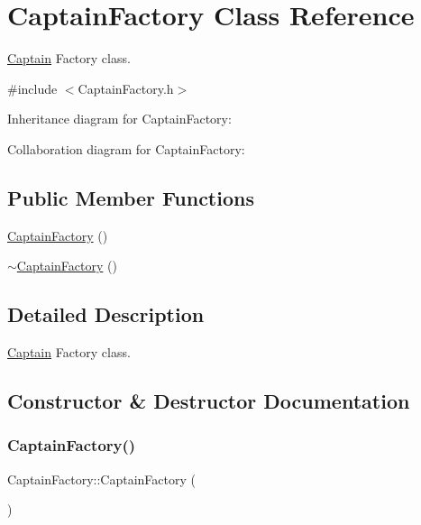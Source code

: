 \hypertarget{classCaptainFactory}{}\section{Captain\+Factory Class Reference}
\label{classCaptainFactory}


\hyperlink{classCaptain}{Captain} Factory class.  




{\ttfamily \#include $<$Captain\+Factory.\+h$>$}



Inheritance diagram for Captain\+Factory\+:


Collaboration diagram for Captain\+Factory\+:
\subsection*{Public Member Functions}
\begin{DoxyCompactItemize}
\item 
\hyperlink{classCaptainFactory_a194bc3adbc4f09ca79df90d1aab30dc1}{Captain\+Factory} ()
\item 
\hyperlink{classCaptainFactory_a1ffe5cdefdefcb36f4c362990dd61080}{$\sim$\+Captain\+Factory} ()
\end{DoxyCompactItemize}


\subsection{Detailed Description}
\hyperlink{classCaptain}{Captain} Factory class. 

\subsection{Constructor \& Destructor Documentation}
\mbox{\label{classCaptainFactory_a194bc3adbc4f09ca79df90d1aab30dc1}} 
\subsubsection{\texorpdfstring{Captain\+Factory()}{CaptainFactory()}}
{\footnotesize\ttfamily Captain\+Factory\+::\+Captain\+Factory (\begin{DoxyParamCaption}{ }\end{DoxyParamCaption})}

